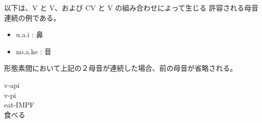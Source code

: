 以下は、{V} と {V}、および {CV} と {V} の組み合わせによって生じる
許容される母音連続の例である。

\begin{itemize}
    \item u.a.i : 鼻 %
    \item no.a.ke : 音
\end{itemize}

形態素間において上記の２母音が連続した場合、前の母音が省略される。
\begin{exe}
    \ex \glll v-api \\
    v-pi \\
    eat-IMPF \\
   \glt 食べる
\end{exe}
